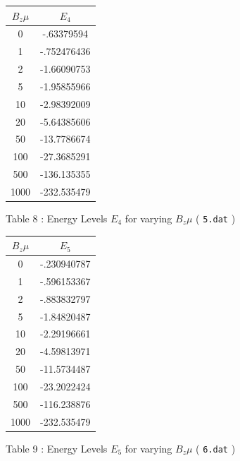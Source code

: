 \documentclass[a4paper]{IEEEtran}
\begin{document}
    \begin{table} 
         \begin{center}
        \begin{tabular}{|c|c|} \hline
        $B_z\mu$ & $E_4$ \\ \hline \hline
        0    &  -.63379594 \\ \hline
        1    &  -.752476436 \\ \hline
        2    &  -1.66090753 \\ \hline
        5    &  -1.95855966 \\ \hline
        10   &  -2.98392009\\ \hline
        20   &  -5.64385606 \\ \hline
        50   &  -13.7786674 \\ \hline
        100  &  -27.3685291 \\ \hline
        500  &  -136.135355 \\ \hline
        1000 &  -232.535479 \\ \hline
        \end{tabular}
         \vspace{1mm}
        \begin{center}
            Table 8 : Energy Levels $E_4$ for varying $B_z\mu$ ( \texttt{5.dat} )
        \end{center}
        \end{center}
    \end{table} 

    \begin{table} 
         \begin{center}
        \begin{tabular}{|c|c|} \hline
        $B_z\mu$ & $E_5$ \\ \hline \hline
        0     & -.230940787 \\ \hline
        1     & -.596153367 \\ \hline
        2     & -.883832797 \\ \hline
        5     & -1.84820487 \\ \hline
        10    & -2.29196661 \\ \hline
        20    & -4.59813971 \\ \hline
        50    & -11.5734487\\ \hline
        100   & -23.2022424 \\ \hline
        500   & -116.238876 \\ \hline
        1000  & -232.535479 \\ \hline
        \end{tabular}
         \vspace{1mm}
        \begin{center}
            Table 9 : Energy Levels $E_5$ for varying $B_z\mu$ ( \texttt{6.dat} )
        \end{center}
        \end{center}
    \end{table} 
\end{document}
